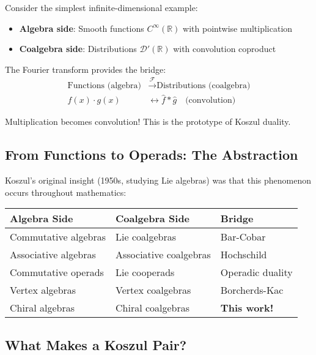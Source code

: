 \begin{example}
Consider the simplest infinite-dimensional example:
\begin{itemize}
\item \textbf{Algebra side}: Smooth functions $C^\infty(\mathbb{R})$ with pointwise multiplication
\item \textbf{Coalgebra side}: Distributions $\mathcal{D}'(\mathbb{R})$ with convolution coproduct
\end{itemize}

The Fourier transform provides the bridge:
\begin{align*}
\text{Functions (algebra)} &\xrightarrow{\mathcal{F}} \text{Distributions (coalgebra)} \\
f(x) \cdot g(x) &\longleftrightarrow \hat{f} * \hat{g} \quad \text{(convolution)}
\end{align*}

Multiplication becomes convolution! This is the prototype of Koszul duality.
\end{example}

\subsection{From Functions to Operads: The Abstraction}

Koszul's original insight (1950s, studying Lie algebras) was that this phenomenon occurs throughout mathematics:

\begin{center}
\begin{tabular}{|l|l|l|}
\hline
\textbf{Algebra Side} & \textbf{Coalgebra Side} & \textbf{Bridge} \\
\hline
Commutative algebras & Lie coalgebras & Bar-Cobar \\
Associative algebras & Associative coalgebras & Hochschild \\
Commutative operads & Lie cooperads & Operadic duality \\
Vertex algebras & Vertex coalgebras & Borcherds-Kac \\
Chiral algebras & Chiral coalgebras & \textbf{This work!} \\
\hline
\end{tabular}
\end{center}

\subsection{What Makes a Koszul Pair?}

